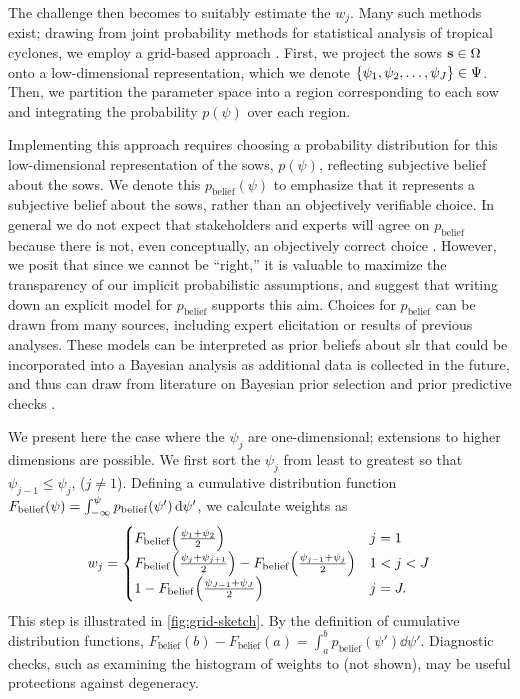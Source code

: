 \documentclass{agujournal2019}
\begin{document}
The challenge then becomes to suitably estimate the $w_j$.
Many such methods exist; drawing from joint probability methods for statistical analysis of tropical cyclones, we employ a grid-based approach \cite{johnson_clara:2013,resio_probabilities:2007,toro_jpm-os:2010}.
First, we project the \glspl{sow} $\vb{s} \in \Omega$ onto a low-dimensional representation, which we denote $\qty{\psi_1, \psi_2, \ldots, \psi_J} \in \Psi$.
Then, we partition the parameter space into a region corresponding to each \gls{sow} and integrating the probability $p(\psi)$ over each region.

Implementing this approach requires choosing a probability distribution for this low-dimensional representation of the \glspl{sow},  $p(\psi)$, reflecting subjective belief about the \glspl{sow}.
We denote this $p_\mathrm{belief}(\psi)$ to emphasize that it represents a subjective belief about the \glspl{sow}, rather than an objectively verifiable choice.
In general we do not expect that stakeholders and experts will agree on $p_\mathrm{belief}$ because there is not, even conceptually, an objectively correct choice \cite{oreskes_verification:1994,walker_deep:2013}.
However, we posit that since we cannot be ``right,'' it is valuable to maximize the transparency of our implicit probabilistic assumptions, and suggest that writing down an explicit model for $p_\mathrm{belief}$ supports this aim.
Choices for $p_\mathrm{belief}$ can be drawn from many sources, including expert elicitation or  results of previous analyses.
These models can be interpreted as prior beliefs about \gls{slr} that could be incorporated into a Bayesian analysis as additional data is collected in the future, and thus can draw from literature on Bayesian prior selection and prior predictive checks \cite{gelman_workflow:2020}.

We present here the case where the $\psi_j$ are one-dimensional; extensions to higher dimensions are possible.
We first sort the $\psi_j$  from least to greatest so that $\psi_{j-1} \leq \psi_j$, ($j \neq 1$).
Defining a cumulative distribution function
$F_\mathrm{belief} \qty(\psi) = \int_{-\infty}^{\psi} p_\mathrm{belief}(\psi') \dd{\psi'}$,
we calculate weights as
\begin{equation}\label{eq:weights}
  w_j = \begin{cases}
    F_\mathrm{belief}\qty(\frac{\psi_1 + \psi_2}{2})                                                              & j = 1     \\
    F_\mathrm{belief}\qty(\frac{\psi_{j} + \psi_{j+1}}{2}) - F_\mathrm{belief}\qty(\frac{\psi_{j-1} + \psi_j}{2}) & 1 < j < J \\
    1 - F_\mathrm{belief}\qty(\frac{\psi_{J-1} + \psi_J}{2})                                                      & j = J.
  \end{cases}
\end{equation}
This step is illustrated in \cref{fig:grid-sketch}.
By the definition of cumulative distribution functions, $F_\mathrm{belief}(b) - F_\mathrm{belief}(a) = \int_a^b p_\mathrm{belief}(\psi') \dd{\psi'}$.
Diagnostic checks, such as examining the histogram of weights to (not shown), may be useful protections against degeneracy.
\end{document}

